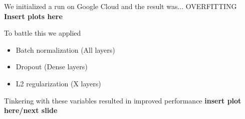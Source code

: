 \documentclass{beamer}
\begin{document}
\begin{frame}
  We initialized a run on Google Cloud and the result was... OVERFITTING
  \textbf{Insert plots here}
\end{frame}

\begin{frame}
  To battle this we applied
  \begin{itemize}
    \item Batch normalization (All layers)
    \item Dropout (Dense layers)
    \item L2 regularization (X layers)
  \end{itemize}
  Tinkering with these variables resulted in improved performance \textbf{insert plot here/next slide}
\end{frame}
\end{document}
